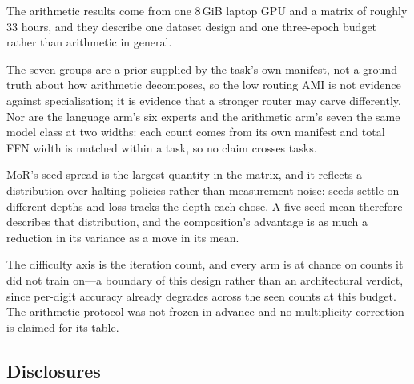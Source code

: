 The arithmetic results come from one 8\,GiB laptop GPU and a matrix of roughly
33 hours, and they describe one dataset design and one three-epoch budget rather
than arithmetic in general.

The seven groups are a prior supplied by the task's own manifest, not a ground
truth about how arithmetic decomposes, so the low routing AMI is not evidence
against specialisation; it is evidence that a stronger router may carve
differently. Nor are the language arm's six experts and the arithmetic arm's
seven the same model class at two widths: each count comes from its own manifest
and total FFN width is matched within a task, so no claim crosses tasks.

MoR's seed spread is the largest quantity in the matrix, and it reflects a
distribution over halting policies rather than measurement noise: seeds settle on
different depths and loss tracks the depth each chose. A five-seed mean therefore
describes that distribution, and the composition's advantage is as much a
reduction in its variance as a move in its mean.

The difficulty axis is the iteration count, and every arm is at chance on counts
it did not train on---a boundary of this design rather than an architectural
verdict, since per-digit accuracy already degrades across the seen counts at this
budget. The arithmetic protocol was not frozen in advance and no multiplicity
correction is claimed for its table.

\subsection{Disclosures}
\label{sec:honesty}

